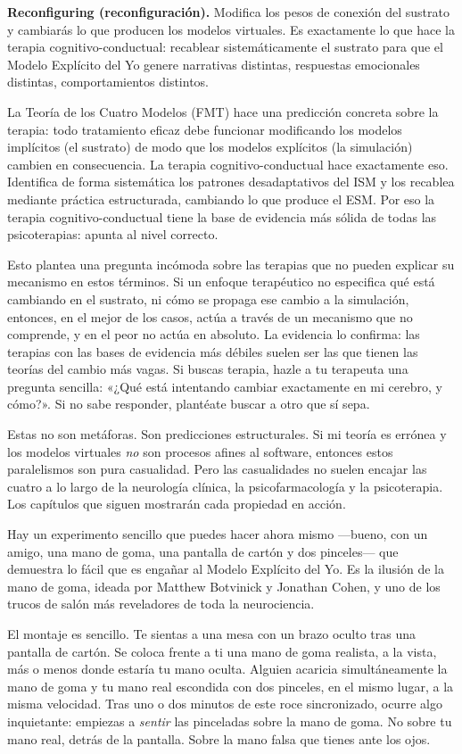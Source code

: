 \documentclass[11pt, twoside, openright]{book}
\begin{document}
\textbf{Reconfiguring (reconfiguración).} Modifica los pesos de conexión del sustrato y cambiarás lo que producen los modelos virtuales. Es exactamente lo que hace la terapia cognitivo-conductual: recablear sistemáticamente el sustrato para que el Modelo Explícito del Yo genere narrativas distintas, respuestas emocionales distintas, comportamientos distintos.

La Teoría de los Cuatro Modelos (FMT) hace una predicción concreta sobre la terapia: todo tratamiento eficaz debe funcionar modificando los modelos implícitos (el sustrato) de modo que los modelos explícitos (la simulación) cambien en consecuencia. La terapia cognitivo-conductual hace exactamente eso. Identifica de forma sistemática los patrones desadaptativos del ISM y los recablea mediante práctica estructurada, cambiando lo que produce el ESM. Por eso la terapia cognitivo-conductual tiene la base de evidencia más sólida de todas las psicoterapias: apunta al nivel correcto.

Esto plantea una pregunta incómoda sobre las terapias que no pueden explicar su mecanismo en estos términos. Si un enfoque terapéutico no especifica qué está cambiando en el sustrato, ni cómo se propaga ese cambio a la simulación, entonces, en el mejor de los casos, actúa a través de un mecanismo que no comprende, y en el peor no actúa en absoluto. La evidencia lo confirma: las terapias con las bases de evidencia más débiles suelen ser las que tienen las teorías del cambio más vagas. Si buscas terapia, hazle a tu terapeuta una pregunta sencilla: «¿Qué está intentando cambiar exactamente en mi cerebro, y cómo?». Si no sabe responder, plantéate buscar a otro que sí sepa.

Estas no son metáforas. Son predicciones estructurales. Si mi teoría es errónea y los modelos virtuales \textit{no} son procesos afines al software, entonces estos paralelismos son pura casualidad. Pero las casualidades no suelen encajar las cuatro a lo largo de la neurología clínica, la psicofarmacología y la psicoterapia. Los capítulos que siguen mostrarán cada propiedad en acción.

Hay un experimento sencillo que puedes hacer ahora mismo ---bueno, con un amigo, una mano de goma, una pantalla de cartón y dos pinceles--- que demuestra lo fácil que es engañar al Modelo Explícito del Yo. Es la ilusión de la mano de goma, ideada por Matthew Botvinick y Jonathan Cohen, y uno de los trucos de salón más reveladores de toda la neurociencia.

El montaje es sencillo. Te sientas a una mesa con un brazo oculto tras una pantalla de cartón. Se coloca frente a ti una mano de goma realista, a la vista, más o menos donde estaría tu mano oculta. Alguien acaricia simultáneamente la mano de goma y tu mano real escondida con dos pinceles, en el mismo lugar, a la misma velocidad. Tras uno o dos minutos de este roce sincronizado, ocurre algo inquietante: empiezas a \textit{sentir} las pinceladas sobre la mano de goma. No sobre tu mano real, detrás de la pantalla. Sobre la mano falsa que tienes ante los ojos.
\end{document}
